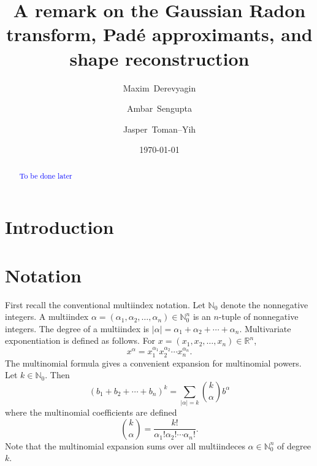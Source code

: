 \documentclass{amsart}
\theoremstyle{remark}
\numberwithin{equation}{section}
\newcommand{\tc}{\textcolor{blue}}
\newcommand{\RR}{\mathbb{R}}
\newcommand{\NN}{\mathbb{N}}
\begin{document}
\title{A remark on the Gaussian Radon transform, Pad\'e approximants, and shape reconstruction}


\date{\today}

\author[M.~Derevyagin]{Maxim~Derevyagin}
\address{
MD,
Department of Mathematics\\
University of Connecticut\\
341 Mansfield Road, U-1009\\
Storrs, CT 06269–1009, USA}

\author[A.~Sengupta]{Ambar~Sengupta}
\address{
AS,
Department of Mathematics\\
University of Connecticut\\
341 Mansfield Road, U–1009\\
Storrs, CT 0626–91009, USA}

\author[J.~Toman–Yih]{Jasper~Toman–Yih}
\address{
JT,
Department of Mathematics\\
University of Connecticut\\
341 Mansfield Road, U–1009\\
Storrs, CT 06269–1009, USA}


\begin{abstract}
\tc{To be done later}
\end{abstract}

\maketitle

\section{Introduction}




\newpage
\section{Notation}

First recall the conventional multiindex notation. Let $\NN_0$ denote the nonnegative integers. A multiindex $\alpha = (\alpha_1, \alpha_2, \ldots, \alpha_n) \in \NN_0^n$ is an $n$-tuple of nonnegative integers. The degree of a multiindex is $|\alpha| = \alpha_1 + \alpha_2 + \cdots + \alpha_n$. Multivariate exponentiation is defined as follows. For $x = (x_1, x_2, \ldots, x_n) \in \RR^n$,
\[
    x^\alpha = x_1^{\alpha_1}x_2^{\alpha_2} \cdots x_n^{\alpha_n}.
\]
The multinomial formula gives a convenient expansion for multinomial powers. Let $k \in \NN_0$. Then
\[
    (b_1 + b_2 + \cdots + b_n)^k = \sum_{|\alpha| = k} \binom{k}{\alpha} b^\alpha
\] 
where the multinomial coefficients are defined
\[
    \binom{k}{\alpha} = \frac{k!}{\alpha_1! \alpha_2! \cdots \alpha_n!}.
\]
Note that the multinomial expansion sums over all multiindeces $\alpha \in \NN_0^n$ of degree $k$.
\end{document}
